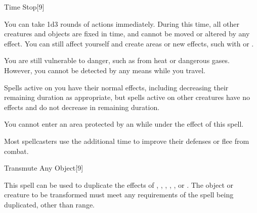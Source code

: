 \begin{spellsection}{Time Stop}[9]
    \begin{spellheader}
    \end{spellheader}
    \begin{spellcontent}
        \begin{spelleffects}
            \spelleffect You can take 1d3 rounds of actions immediately. During this time, all other creatures and objects are fixed in time, and cannot be moved or altered by any effect. You can still affect yourself and create areas or new effects, such with  or .

            You are still vulnerable to danger, such as from heat or dangerous gases. However, you cannot be detected by any means while you travel.
        \end{spelleffects}
    \end{spellcontent}
    \begin{spellfooter}
        \spellnotes Spells active on you have their normal effects, including decreasing their remaining duration as appropriate, but spells active on other creatures have no effects and do not decrease in remaining duration.

        You cannot enter an area protected by an  while under the effect of this spell.

        Most spellcasters use the additional time to improve their defenses or flee from combat.
        \miscastexplode
    \end{spellfooter}
\end{spellsection}

\begin{spellsection}{Transmute Any Object}[9]
    \begin{spellheader}
    \end{spellheader}
    \begin{spellcontent}
        \begin{spelltargetinginfo}
            \spellrng{\rngmed}
        \end{spelltargetinginfo}
        \begin{spelleffects}
            \spellspecial This spell can be used to duplicate the effects of , , , , , or . The object or creature to be transformed must meet any requirements of the spell being duplicated, other than range.
        \end{spelleffects}
    \end{spellcontent}
    \begin{spellfooter}
        \miscastexplode
    \end{spellfooter}
\end{spellsection}

